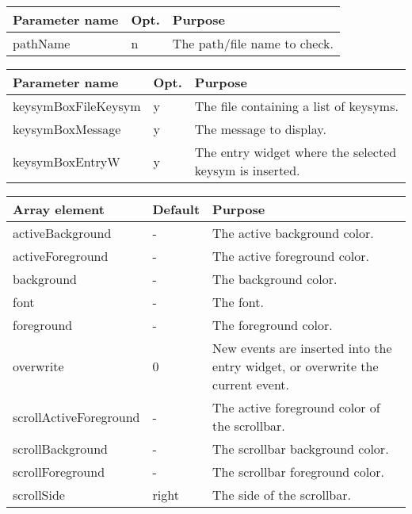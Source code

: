 {\newpage
\clearpage
\samepage \begin{figure}[ht]
  \centerline{
  \epsfysize=4cm
  }
  
  \label{fig:InputBox}
\end{figure}
}

{\newpage
\clearpage
\samepage \begin{tabular}{|l|l|p{6.5cm}|} \hline
Parameter name & Opt. & Purpose \\  \hline
pathName       & n    & The path/file name to check. \\ 
                        \hline 
\end{tabular}
}

{\newpage
\clearpage
\samepage \begin{tabular}{|l|l|p{6cm}|} \hline
Parameter name      & Opt. & Purpose\\  \hline
keysymBoxFileKeysym & y    & The file containing a list of
                             keysyms.\\  \hline
keysymBoxMessage    & y    & The message to display.\\  \hline 
keysymBoxEntryW     & y    & The entry widget where the
                             selected keysym is inserted.\\  \hline
\end{tabular}
}

{\newpage
\clearpage
\samepage \begin{tabular}{|l|l|p{5.5cm}|} \hline
Array element          & Default & Purpose\\  \hline
activeBackground       & -       & The active background
                                   color.\\  \hline
activeForeground       & -       & The active foreground
                                   color.\\  \hline
background             & -       & The background color.\\  \hline
font                   & -       & The font. \\  \hline
foreground             & -       & The foreground color.\\  \hline
overwrite              & 0       & New events are inserted
                                   into the entry widget, or
                                   overwrite the current
                                   event.\\  \hline
scrollActiveForeground & -       & The active foreground
                                   color of the scrollbar.\\  \hline 
scrollBackground       & -       & The scrollbar background
                                   color.\\  \hline 
scrollForeground       & -       & The scrollbar foreground
                                   color.\\  \hline
scrollSide             & right   & The side of the
                                   scrollbar.\\  \hline
\end{tabular}
}

